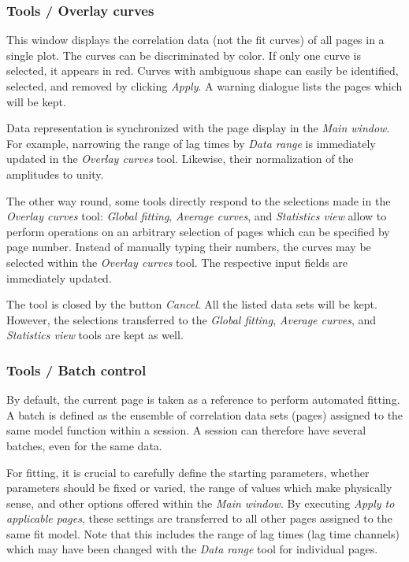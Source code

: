 \subsubsection{Tools / Overlay curves}
\label{sec:menub.tools.overl}
This window displays the correlation data (not the fit curves) of all pages in a single plot. The curves can be discriminated by color. If only one curve is selected, it appears in red. Curves with ambiguous shape can easily be identified, selected, and removed by clicking \textit{Apply}. A warning dialogue lists the pages which will be kept.

Data representation is synchronized with the page display in the \textit{Main window}. For example, narrowing the range of lag times by \textit{Data range }is immediately updated in the \textit{Overlay curves }tool. Likewise, their normalization of the amplitudes to unity.

The other way round, some tools directly respond to the selections made in the \textit{Overlay curves} tool: \textit{Global fitting}, \textit{Average curves}, and \textit{Statistics view} allow to perform operations on an arbitrary selection of pages which can be specified by page number. Instead of manually typing their numbers, the curves may be selected within the \textit{Overlay curves} tool. The respective input fields are immediately updated.

The tool is closed by the button \textit{Cancel}. All the listed data sets will be kept. However, the selections transferred to the \textit{Global fitting}, \textit{Average curves}, and \textit{Statistics view} tools are kept as well.

\subsubsection{Tools / Batch control}
\label{sec:menub.tools.batch}
By default, the current page is taken as a reference to perform automated fitting. A batch is defined as the ensemble of correlation data sets (pages) assigned to the same model function within a session. A session can therefore have several batches, even for the same data. 

For fitting, it is crucial to carefully define the starting parameters, whether parameters should be fixed or varied, the range of values which make physically sense, and other options offered within the \textit{Main window}. By executing \textit{Apply to applicable pages}, these settings are transferred to all other pages assigned to the same fit model. Note that this includes the range of lag times (lag time channels) which may have been changed with the \textit{Data range} tool for individual pages.

